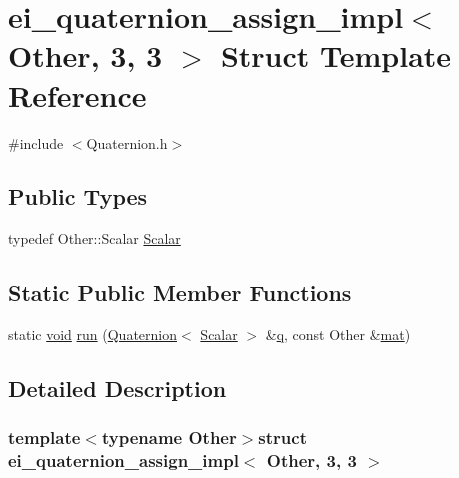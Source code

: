 \hypertarget{structei__quaternion__assign__impl_3_01_other_00_013_00_013_01_4}{\section{ei\-\_\-quaternion\-\_\-assign\-\_\-impl$<$ Other, 3, 3 $>$ Struct Template Reference}
\label{structei__quaternion__assign__impl_3_01_other_00_013_00_013_01_4}
}


{\ttfamily \#include $<$Quaternion.\-h$>$}

\subsection*{Public Types}
\begin{DoxyCompactItemize}
\item 
typedef Other\-::\-Scalar \hyperlink{structei__quaternion__assign__impl_3_01_other_00_013_00_013_01_4_a398ebe19ef4d939766ec856448544d4f}{Scalar}
\end{DoxyCompactItemize}
\subsection*{Static Public Member Functions}
\begin{DoxyCompactItemize}
\item 
static \hyperlink{group___u_a_v_objects_plugin_ga444cf2ff3f0ecbe028adce838d373f5c}{void} \hyperlink{structei__quaternion__assign__impl_3_01_other_00_013_00_013_01_4_a7db7e09185674af7e52d255e997bb33c}{run} (\hyperlink{class_quaternion}{Quaternion}$<$ \hyperlink{structei__quaternion__assign__impl_3_01_other_00_013_00_013_01_4_a398ebe19ef4d939766ec856448544d4f}{Scalar} $>$ \&\hyperlink{glext_8h_afb30bc844faa48275d1c84294956a44b}{q}, const Other \&\hyperlink{uavobjecttemplate_8m_a16a51e808b16c46bbfd36da2e37cd123}{mat})
\end{DoxyCompactItemize}


\subsection{Detailed Description}
\subsubsection*{template$<$typename Other$>$struct ei\-\_\-quaternion\-\_\-assign\-\_\-impl$<$ Other, 3, 3 $>$}




